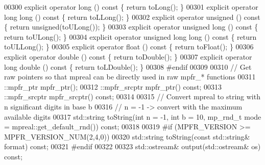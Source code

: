 \begin{DoxyCode}
00300     \textcolor{keyword}{explicit} \textcolor{keyword}{operator} long               ()\textcolor{keyword}{ const }\{ \textcolor{keywordflow}{return} toLong();                 \}
00301     \textcolor{keyword}{explicit} \textcolor{keyword}{operator} \textcolor{keywordtype}{long} long          ()\textcolor{keyword}{ const }\{ \textcolor{keywordflow}{return} toLLong();                \}
00302     \textcolor{keyword}{explicit} \textcolor{keyword}{operator} unsigned           ()\textcolor{keyword}{ const }\{ \textcolor{keywordflow}{return} unsigned(toULong());      \}
00303     \textcolor{keyword}{explicit} \textcolor{keyword}{operator} \textcolor{keywordtype}{unsigned} long      ()\textcolor{keyword}{ const }\{ \textcolor{keywordflow}{return} toULong();                \}
00304     \textcolor{keyword}{explicit} \textcolor{keyword}{operator} \textcolor{keywordtype}{unsigned} \textcolor{keywordtype}{long} long ()\textcolor{keyword}{ const }\{ \textcolor{keywordflow}{return} toULLong();               \}
00305     \textcolor{keyword}{explicit} \textcolor{keyword}{operator} float              ()\textcolor{keyword}{ const }\{ \textcolor{keywordflow}{return} toFloat();                \}
00306     \textcolor{keyword}{explicit} \textcolor{keyword}{operator} double             ()\textcolor{keyword}{ const }\{ \textcolor{keywordflow}{return} toDouble();               \}
00307     \textcolor{keyword}{explicit} \textcolor{keyword}{operator} \textcolor{keywordtype}{long} double        ()\textcolor{keyword}{ const }\{ \textcolor{keywordflow}{return} toLDouble();              \}
00308 \textcolor{preprocessor}{#endif}
00309 
00310     \textcolor{comment}{// Get raw pointers so that mpreal can be directly used in raw mpfr\_* functions}
00311     ::mpfr\_ptr    mpfr\_ptr();
00312     ::mpfr\_srcptr mpfr\_ptr()    \textcolor{keyword}{const};
00313     ::mpfr\_srcptr mpfr\_srcptr() \textcolor{keyword}{const};
00314 
00315     \textcolor{comment}{// Convert mpreal to string with n significant digits in base b}
00316     \textcolor{comment}{// n = -1 -> convert with the maximum available digits}
00317     std::string toString(\textcolor{keywordtype}{int} n = -1, \textcolor{keywordtype}{int} b = 10, mp\_rnd\_t mode = mpreal::get\_default\_rnd()) \textcolor{keyword}{const};
00318 
00319 \textcolor{preprocessor}{#if (MPFR\_VERSION >= MPFR\_VERSION\_NUM(2,4,0))}
00320     std::string toString(\textcolor{keyword}{const} std::string& format) \textcolor{keyword}{const};
00321 \textcolor{preprocessor}{#endif}
00322 
00323     std::ostream& output(std::ostream& os) \textcolor{keyword}{const};

\end{DoxyCode}
